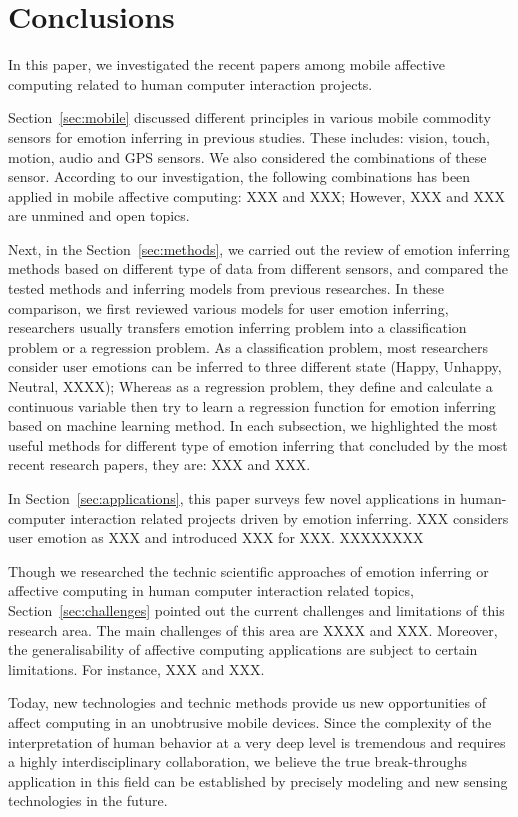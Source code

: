 \section{Conclusions}

In this paper, we investigated the recent papers among mobile affective computing related to human computer interaction projects.

Section~\ref{sec:mobile} discussed different principles in various mobile commodity sensors for emotion inferring in previous studies. These includes: vision, touch, motion, audio and GPS sensors. We also considered the combinations of these sensor. According to our investigation, the following combinations has been applied in mobile affective computing: XXX and XXX; However, XXX and XXX are unmined and open topics.

Next, in the Section~\ref{sec:methods}, we carried out the review of emotion inferring methods based on different type of data from different sensors, and compared the tested methods and inferring models from previous researches. In these comparison, we first reviewed various models for user emotion inferring, researchers usually transfers emotion inferring problem into a classification problem or a regression problem. As a classification problem, most researchers consider user emotions can be inferred to three different state (Happy, Unhappy, Neutral, XXXX); Whereas as a regression problem, they define and calculate a continuous variable then try to learn a regression function for emotion inferring based on machine learning method. In each subsection, we highlighted the most useful methods for different type of emotion inferring that concluded by the most recent research papers, they are: XXX and XXX.

In Section~\ref{sec:applications}, this paper surveys few novel applications in human-computer interaction related projects driven by emotion inferring. XXX considers user emotion as XXX and introduced XXX for XXX. XXXXXXXX

Though we researched the technic scientific approaches of emotion inferring or affective computing in human computer interaction related topics, Section~\ref{sec:challenges} pointed out the current challenges and limitations of this research area. The main challenges of this area are XXXX and XXX. Moreover, the generalisability of affective computing applications are subject to certain limitations. For instance, XXX and XXX.

Today, new technologies and technic methods provide us new opportunities of affect computing in an unobtrusive mobile devices. Since the complexity of the interpretation of human behavior at a very deep level is tremendous and requires a highly interdisciplinary collaboration, we believe the true break-throughs application in this field can be established by precisely modeling and new sensing technologies in the future.